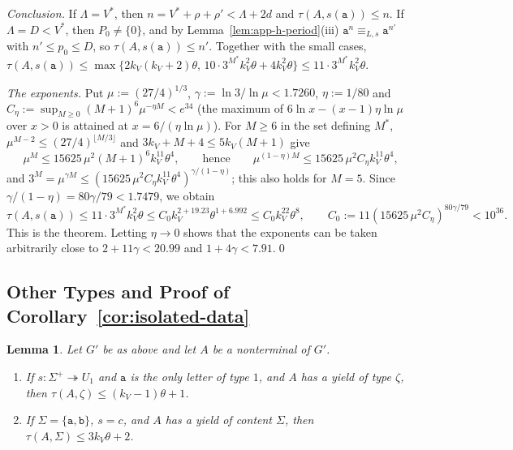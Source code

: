 \documentclass[11pt]{article}
\numberwithin{equation}{section}
\theoremstyle{plain}
\newtheorem{lemma}[theorem]{Lemma}
\theoremstyle{definition}
\theoremstyle{remark}
\theoremstyle{plain}
\begin{document}
\emph{Conclusion.}  If $\Lambda=V^*$, then $n=V^*+\rho+\rho'<\Lambda+2d$ and
$\tau(A,s(\mathtt a))\le n$.  If $\Lambda=D<V^*$, then $P_0\ne\{0\}$, and by
Lemma~\ref{lem:app-h-period}(iii) $\mathtt a^n\equiv_{L,s}\mathtt a^{n'}$ with
$n'\le p_0\le D$, so $\tau(A,s(\mathtt a))\le n'$.  Together with the small cases,
$\tau(A,s(\mathtt a))\le\max\{2k_V(k_V+2)\theta,\,10\cdot3^{M^*}k_V^2\theta+4k_V^2\theta\}
\le11\cdot3^{M^*}k_V^2\theta$.

\emph{The exponents.}  Put $\mu:=(27/4)^{1/3}$, $\gamma:=\ln3/\ln\mu<1.7260$,
$\eta:=1/80$ and $C_\eta:=\sup_{M\ge0}(M+1)^6\mu^{-\eta M}<e^{34}$ (the maximum of
$6\ln x-(x-1)\eta\ln\mu$ over $x>0$ is attained at $x=6/(\eta\ln\mu)$).  For $M\ge6$
in the set defining $M^*$, $\mu^{M-2}\le(27/4)^{\lfloor M/3\rfloor}$ and
$3k_V+M+4\le5k_V(M+1)$ give
\[
 \mu^M\le15625\,\mu^2(M+1)^6k_V^{11}\theta^4,\qquad\text{hence}\qquad
 \mu^{(1-\eta)M}\le15625\,\mu^2C_\eta k_V^{11}\theta^4,
\]
and $3^M=\mu^{\gamma M}\le(15625\,\mu^2C_\eta k_V^{11}\theta^4)^{\gamma/(1-\eta)}$;
this also holds for $M=5$.  Since $\gamma/(1-\eta)=80\gamma/79<1.7479$, we obtain
\[
 \tau(A,s(\mathtt a))\le11\cdot3^{M^*}k_V^2\theta\le C_0k_V^{2+19.23}\theta^{1+6.992}
 \le C_0k_V^{22}\theta^8,\qquad C_0:=11(15625\,\mu^2C_\eta)^{80\gamma/79}<10^{36}.
\]
This is the theorem.  Letting $\eta\to0$ shows that the exponents can be taken
arbitrarily close to $2+11\gamma<20.99$ and $1+4\gamma<7.91$.\qed

\subsection{Other Types and Proof of Corollary~\ref{cor:isolated-data}}

\begin{lemma}
\label{lem:app-h-other}
Let $G'$ be as above and let $A$ be a nonterminal of $G'$.
\begin{enumerate}[label=\textup{(\roman*)},leftmargin=*]
\item If $s:\Sigma^+\twoheadrightarrow U_1$ and $\mathtt a$ is the only letter of
type $1$, and $A$ has a yield of type $\zeta$, then
$\tau(A,\zeta)\le(k_V-1)\theta+1$.
\item If $\Sigma=\{\mathtt a,\mathtt b\}$, $s=c$, and $A$ has a yield of content
$\Sigma$, then $\tau(A,\Sigma)\le3k_V\theta+2$.
\end{enumerate}
\end{lemma}
\end{document}
